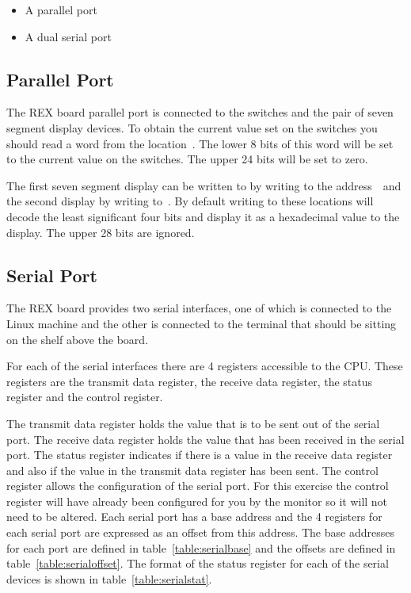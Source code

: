 \documentclass[a4paper,10pt]{article}
\begin{document}
\begin{itemize}
\item A parallel port
\item A dual serial port
\end{itemize}

\subsection{Parallel Port}
\label{sec:parallel}

The REX board parallel port is connected to the switches and the pair
of seven segment display devices. To obtain the current value set on
the switches you should read a word from the location~\LOCSWS. The
lower 8 bits of this word will be set to the current value on the
switches. The upper 24 bits will be set to zero.

The first seven segment display can be written to by writing to the
address~\LOCSSDONE~and the second display by writing to~\LOCSSDTWO. By
default writing to these locations will decode the least significant
four bits and display it as a hexadecimal value to the display. The
upper 28 bits are ignored.


\subsection{Serial Port}


The REX board provides two serial interfaces, one of which is
connected to the Linux machine and the other is connected to the
terminal that should be sitting on the shelf above the board. 

For each of the serial interfaces there are 4 registers accessible to
the CPU. These registers are the transmit data register, the receive
data register, the status register and the control register.

The transmit data register holds the value that is to be sent out of
the serial port. The receive data register holds the value that has
been received in the serial port. The status register indicates if
there is a value in the receive data register and also if the value in
the transmit data register has been sent. The control register allows
the configuration of the serial port. For this exercise the control
register will have already been configured for you by the monitor so
it will not need to be altered. Each serial port has a base address
and the 4 registers for each serial port are expressed as an offset
from this address. The base addresses for each port are defined in
table~\ref{table:serialbase} and the offsets are defined in
table~\ref{table:serialoffset}. The format of the status register for
each of the serial devices is shown in table~\ref{table:serialstat}.
\end{document}
